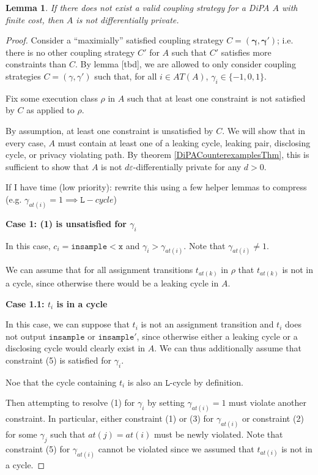 \documentclass[12pt]{article}
\newcommand{\lguard}[1][x]{\texttt{insample} < #1}
\newcommand{\lcycle}{\texttt{L}-cycle}
\newtheorem{lemma}[thm]{Lemma}
\theoremstyle{definition}
\begin{document}
\begin{lemma}
    If there does not exist a valid coupling strategy for a DiPA $A$ with finite cost, then $A$ is not differentially private. 
\end{lemma}
\begin{proof}
    Consider a ``maximially'' satisfied coupling strategy $C=(\mathbf{\gamma}, \mathbf{\gamma}')$; i.e. there is no other coupling strategy $C'$ for $A$ such that $C'$ satisfies more constraints than $C$. By lemma [tbd], we are allowed to only consider coupling strategies $C=(\gamma, \gamma')$ such that, for all $i\in AT(A)$, $\gamma_i \in \{-1, 0, 1\}$. 

    Fix some execution class $\rho$ in $A$ such that at least one constraint is not satisfied by $C$ as applied to $\rho$.

    By assumption, at least one constraint is unsatisfied by $C$. We will show that in every case, $A$ must contain at least one of a leaking cycle, leaking pair, disclosing cycle, or privacy violating path. By theorem \ref{DiPACounterexamplesThm}, this is sufficient to show that $A$ is not $d\varepsilon$-differentially private for any $d>0$.

    {\color{red} If I have time (low priority): rewrite this using a few helper lemmas to compress (e.g. $\gamma_{at(i)} =1\implies \lcycle$)}

    \textbf{Case 1: (1) is unsatisfied for $\gamma_i$}
    
    In this case, $c_i = \lguard[\texttt{x}]$ and $\gamma_i > \gamma_{at(i)}$. Note that $\gamma_{at(i)} \neq 1$. 

    We can assume that for all assignment transitions $t_{at(k)}$ in $\rho$ that $t_{at(k)}$ is not in a cycle, since otherwise there would be a leaking cycle in $A$. 

    \textbf{Case 1.1: $t_i$ is in a cycle}

    In this case, we can suppose that $t_i$ is not an assignment transition and $t_i$ does not output $\texttt{insample}$ or $\texttt{insample}'$, since otherwise either a leaking cycle or a disclosing cycle would clearly exist in $A$. We can thus additionally assume that constraint (5) is satisfied for $\gamma_i$. 
    
    Noe that the cycle containing $t_i$ is also an $\texttt{L}$-cycle by definition.

    Then attempting to resolve (1) for $\gamma_i$ by setting $\gamma_{at(i)} = 1$ must violate another constraint. In particular, either constraint (1) or (3) for $\gamma_{at(i)}$ or constraint (2) for some $\gamma_j$ such that $at(j) = at(i)$ must be newly violated. Note that constraint (5) for $\gamma_{at(i)}$ cannot be violated since we assumed that $t_{at(i)}$ is not in a cycle. 


\end{proof}
\end{document}
